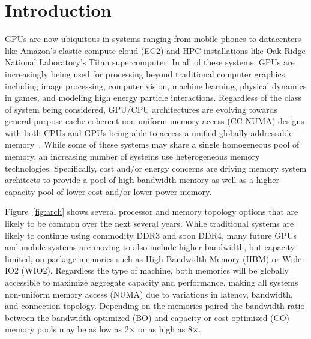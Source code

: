 \section{Introduction}
GPUs are now ubiquitous in systems ranging from mobile phones to datacenters like 
Amazon's elastic compute cloud (EC2) and HPC installations like Oak Ridge 
National Laboratory's Titan supercomputer.  In all of these systems, GPUs are 
increasingly being used for processing beyond traditional computer graphics, 
including image processing, computer vision, machine learning, physical dynamics 
in games, and modeling high energy particle interactions. Regardless of the 
class of system being considered, GPU/CPU architectures are evolving towards 
general-purpose cache coherent non-uniform memory access (CC-NUMA) designs with 
both CPUs  and GPUs being able to access a unified globally-addressable 
memory~\cite{HSA}.  While some of these systems may share a single homogeneous 
pool of memory, an increasing number of systems use 
heterogeneous memory technologies.  Specifically, cost and/or energy concerns 
are driving memory system architects to provide a pool of high-bandwidth memory 
as well as a higher-capacity pool of lower-cost and/or lower-power memory.

Figure~\ref{fig:arch} shows several processor and memory topology options that 
are likely to be common over the next several years. While 
traditional systems are likely to continue using commodity DDR3 and soon DDR4, 
many future GPUs and mobile systems are moving to also include higher bandwidth, 
but capacity limited, on-package memories such as High Bandwidth Memory (HBM) or 
Wide-IO2 (WIO2)\@. Regardless the type of machine, both memories will be globally accessible
to maximize aggregate capacity and performance, making all systems non-uniform
memory access (NUMA) due to variations in latency, bandwidth, and connection
topology. Depending on the memories paired the bandwidth ratio between 
the bandwidth-optimized (BO) and capacity or cost optimized (CO) memory pools may be 
as low as 2$\times$ or as high as 8$\times$.

